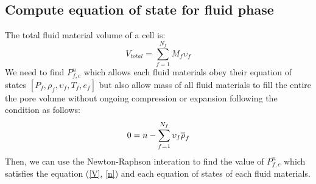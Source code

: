 \documentclass[preprint,12pt]{elsarticle}
\begin{document}
\subsection{\textsf{Compute equation of state for fluid phase}}
The total fluid material volume of a cell is:
%
%
\begin{equation}
\label{V}
    V_{total} = \sum_{f=1}^{N_f} M_f \upsilon_f 
\end {equation}
%
%
We need to find $P_{f,c}^n$ which allows each fluid materials obey their equation of states $[P_f, \rho_f, \upsilon_f, T_f, e_f]$ but also allow mass of all fluid materials to fill the entire the pore volume without ongoing compression or expansion following the condition as follows:
%
%
\begin{equation}
    0 = n - \sum_{f=1}^{N_f} \upsilon_f \overline{\rho}_f\\
\label{n}
\end {equation}
%
%
Then, we can use the Newton-Raphson interation to find the value of $P_{f,c}^n$ which satisfies the equation (\ref{V}, \ref{n}) and each equation of states of each fluid materials.
\end{document}
